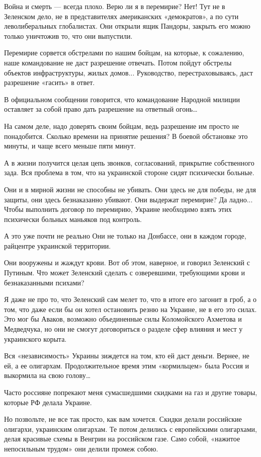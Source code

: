 Война и смерть --- всегда плохо. Верю ли я в перемирие?
Нет!
Тут не в Зеленском дело, не в представителях американских «демократов», а по сути леволиберальных глобалистах. Они открыли ящик Пандоры, закрыть его можно только уничтожив то, что они выпустили.

Перемирие сорвется обстрелами по нашим бойцам, на которые, к сожалению, наше командование не даст разрешение отвечать. Потом пойдут обстрелы объектов инфраструктуры, жилых домов...
Руководство, перестраховываясь, даст разрешение «гасить» в ответ.

В официальном сообщении говорится, что командование Народной милиции оставляет за собой право дать разрешение на ответный огонь…

На самом деле, надо доверять своим бойцам, ведь разрешение им просто не понадобится. Сколько времени на принятие решения?
В боевой обстановке это минуты, и чаще всего меньше пяти минут.

А в жизни получится целая цепь звонков, согласований, прикрытие собственного зада.
Вся проблема в том, что на украинской стороне сидят психически больные.

Они и в мирной жизни не способны не убивать.
Они здесь не для победы, не для защиты, они здесь безнаказанно убивают. Они выдержат перемирие?
Да ладно...
Чтобы выполнить договор по перемирию, Украине необходимо взять этих психически больных маньяков под контроль.

А это уже почти не реально
Они не только на Донбассе, они в каждом городе, райцентре украинской территории.

Они вооружены и жаждут крови.
Вот об этом, наверное, и говорил Зеленский с Путиным.
Что может Зеленский сделать с озверевшими, требующими крови и безнаказанными психами?

Я даже не про то, что Зеленский сам мелет то, что в итоге его загонит в гроб, а о том, что даже если бы он хотел остановить резню на Украине, не в его это силах.
Это мог бы Аваков, возможно объединенные силы Коломойского Ахметова и Медведчука, но они не смогут договориться о разделе сфер влияния и мест у украинского корыта.

Вся «независимость» Украины зиждется на том, кто ей даст деньги.
Вернее, не ей, а ее олигархам.
Продолжительное время этим «кормильцем» была Россия и выкормила на свою голову…

Часто россияне попрекают меня сумасшедшими скидками на газ и другие товары, которые РФ делала Украине.

Но позвольте, не все так просто, как вам хочется. Скидки делали российские олигархи, украинским олигархам.
Те потом делились с европейскими олигархами, делая красивые схемы в Венгрии на российском газе. Само собой, «нажитое непосильным трудом» они делили промеж собою.

